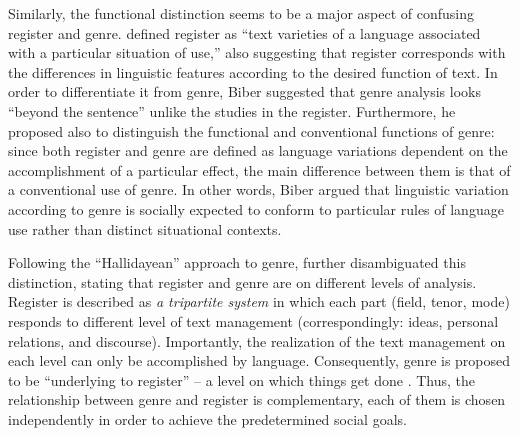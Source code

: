 \documentclass[12pt, draft]{article}
\begin{document}
Similarly, the functional distinction seems to be a major aspect of confusing register and genre. \textcite[p. 191]{biber2012} defined register as ``text varieties of a language associated with a particular situation of use,'' also suggesting that register corresponds with the differences in linguistic features according to the desired function of text. In order to differentiate it from genre, Biber suggested that genre analysis looks ``beyond the sentence'' unlike the studies in the register. Furthermore, he proposed also to distinguish the functional and conventional functions of genre: since both register and genre are defined as language variations dependent on the accomplishment of a particular effect, the main difference between them is that of a conventional use of genre. In other words, Biber argued that linguistic variation according to genre is socially expected to conform to particular rules of language use rather than distinct situational contexts. 

Following the ``Hallidayean'' approach to genre, \textcite{swales1990} further disambiguated this distinction, stating that register and genre are on different levels of analysis. Register is described as \textit{a tripartite system} in which each part (field, tenor, mode) responds to different level of text management (correspondingly: ideas, personal relations, and discourse). Importantly, the realization of the text management on each level can only be accomplished by language. Consequently, genre is proposed to be ``underlying to register'' -- a level on which things get done \parencite[p. 40]{swales1990}. Thus, the relationship between genre and register is complementary, each of them is chosen independently in order to achieve the predetermined social goals.
\end{document}
